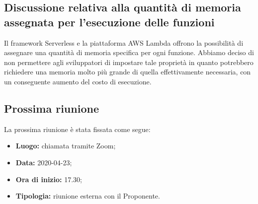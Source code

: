 	\subsection{Discussione relativa alla quantità di memoria assegnata per l'esecuzione delle funzioni}
	Il framework Serverless e la piattaforma AWS Lambda offrono la possibilità di assegnare una quantità di memoria specifica per ogni funzione.
	Abbiamo deciso di non permettere agli sviluppatori di impostare tale proprietà in quanto potrebbero richiedere una memoria molto più grande di quella effettivamente necessaria, con un conseguente aumento del costo di esecuzione.

	\subsection{Prossima riunione}
		La prossima riunione è stata fissata come segue:
		\begin{itemize}
			\item \textbf{Luogo: } chiamata tramite Zoom;
			\item \textbf{Data: } 2020-04-23;
			\item \textbf{Ora di inizio: } 17.30;
			\item \textbf{Tipologia: } riunione esterna con il Proponente.
		\end{itemize}
